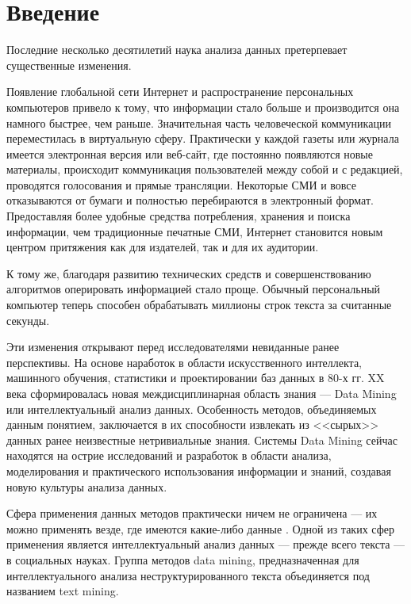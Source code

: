 \chapter*{Введение}							%

Последние несколько десятилетий наука анализа данных претерпевает существенные изменения. 

Появление глобальной сети Интернет и распространение персональных компьютеров привело к тому, что информации стало больше и производится она намного быстрее, чем раньше. Значительная часть человеческой коммуникации переместилась в виртуальную сферу. Практически у каждой газеты или журнала имеется электронная версия или веб-сайт, где постоянно появляются новые материалы, происходит коммуникация пользователей между собой и с редакцией, проводятся голосования и прямые трансляции. Некоторые СМИ и вовсе отказываются от бумаги и полностью перебираются в электронный формат. Предоставляя более удобные средства потребления, хранения и поиска информации, чем традиционные печатные СМИ, Интернет становится новым центром притяжения как для издателей, так и для их аудитории.

К тому же, благодаря развитию технических средств и совершенствованию алгоритмов оперировать информацией стало проще. Обычный персональный компьютер теперь способен обрабатывать миллионы строк текста за считанные секунды.

Эти изменения открывают перед исследователями невиданные ранее перспективы. На основе наработок в области искусственного интеллекта, машинного обучения, статистики и проектировании баз данных в 80-х гг. XX века сформировалась новая междисциплинарная область знания --- Data Mining или интеллектуальный анализ данных. Особенность методов, объединяемых данным понятием, заключается в их способности извлекать из <<сырых>> данных ранее неизвестные нетривиальные знания. Системы Data Mining сейчас находятся на острие исследований и разработок в области анализа, моделирования и практического использования информации и знаний, создавая новую культуры анализа данных.

Сфера применения данных методов практически ничем не ограничена --- их можно применять везде, где имеются какие-либо данные \cite[стр. 81]{Duk2011}. Одной из таких сфер применения является интеллектуальный анализ данных --- прежде всего текста --- в социальных науках. Группа методов data mining, предназначенная для интеллектуального анализа неструктурированного текста объединяется под названием text mining.

